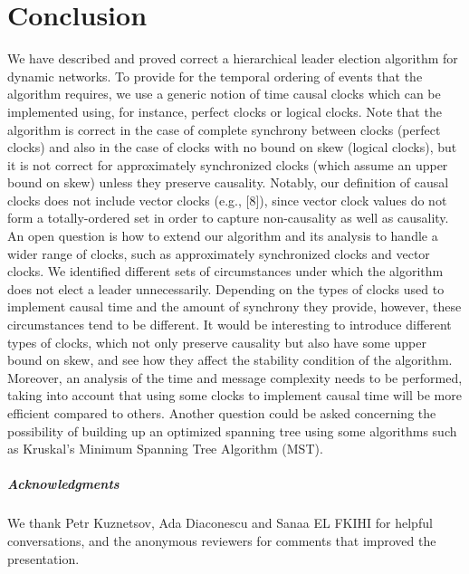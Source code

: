 \chapter{Conclusion}

We have described and proved correct a hierarchical leader election algorithm for dynamic networks. To provide for the temporal ordering of events that the algorithm requires, we use a generic notion of time causal clocks which can be implemented using, for instance, perfect clocks or logical clocks. Note that the algorithm is correct in the case of complete synchrony between clocks (perfect clocks) and also in the case of clocks with no bound on skew (logical clocks), but it is not correct for approximately synchronized clocks (which assume an upper bound on skew) unless they preserve causality. Notably, our definition of causal clocks does not include vector clocks (e.g., [8]), since vector clock values do not form a totally-ordered set in order to capture non-causality as well as causality. An open question is how to extend our algorithm and its analysis to handle a wider range of clocks, such as approximately synchronized clocks and vector clocks. We identified different sets of circumstances under which the algorithm does not elect a leader unnecessarily. Depending on the types of clocks used to implement causal time and the amount of synchrony they provide, however, these circumstances tend to be different. It would be interesting to introduce different types of clocks, which not only preserve causality but also have some upper bound on skew, and see how they affect the stability condition of the algorithm. Moreover, an analysis of the time and message complexity needs to be performed, taking into account that using some clocks to implement causal time will be more efficient compared to others. Another question could be asked concerning the possibility of building up an optimized spanning tree using some algorithms such as Kruskal's Minimum Spanning Tree Algorithm (MST).

\paragraph{Acknowledgments}We thank Petr Kuznetsov, Ada Diaconescu and Sanaa EL FKIHI for helpful conversations, and the anonymous reviewers for comments that improved the presentation.

